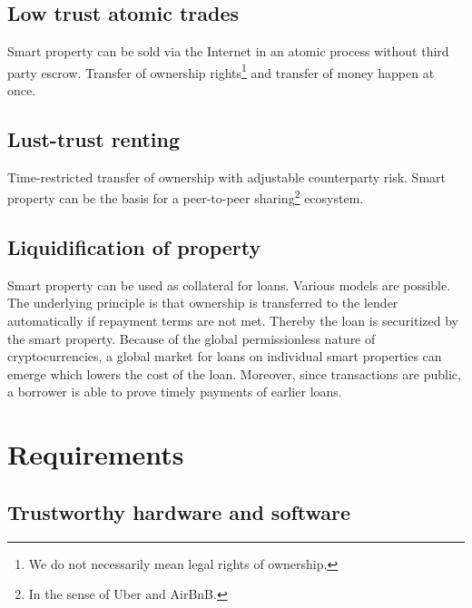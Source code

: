 \subsection{Low trust atomic trades}

Smart property can be sold via the Internet in an atomic process without third party escrow. Transfer of ownership rights\footnote{We do not necessarily mean legal rights of ownership.} and transfer of money happen at once. 



\subsection{Lust-trust renting}

Time-restricted transfer of ownership with adjustable counterparty risk. Smart property can be the basis for a peer-to-peer sharing\footnote{In the sense of Uber and AirBnB.} ecosystem. 

\subsection{Liquidification of property}

Smart property can be used as collateral for loans. Various models are possible. The underlying principle is that ownership is transferred to the lender automatically if repayment terms are not met. Thereby the loan is securitized by the smart property. Because of the global permissionless nature of cryptocurrencies, a global market for loans on individual smart properties can emerge which lowers the cost of the loan. Moreover, since transactions are public, a borrower is able to prove timely payments of earlier loans. 

\section{Requirements}

\subsection{Trustworthy hardware and software}

